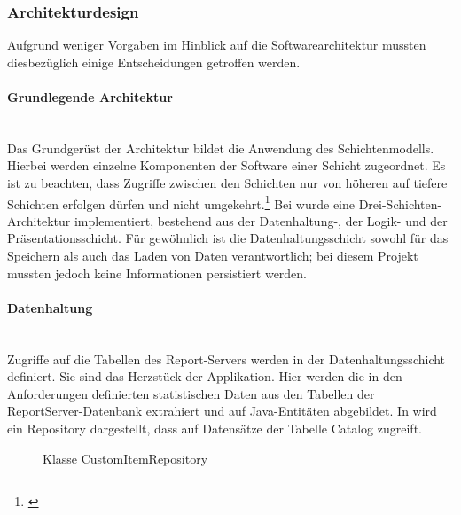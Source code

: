 \subsubsection{Architekturdesign}
\label{sec:Architekturdesign}
Aufgrund weniger Vorgaben im Hinblick auf die Softwarearchitektur mussten diesbezüglich einige Entscheidungen getroffen werden.

\paragraph{Grundlegende Architektur} ~\\
\label{p:Architektur}
Das Grundgerüst der Architektur bildet die Anwendung des Schichtenmodells. Hierbei werden einzelne Komponenten der Software einer Schicht zugeordnet. Es ist zu beachten, dass Zugriffe zwischen den Schichten nur von höheren auf tiefere Schichten erfolgen dürfen und nicht umgekehrt.\footnote{\Vgl \cite{wiki:arch}}
Bei \projektName wurde eine Drei-Schichten-Architektur implementiert, bestehend aus der Datenhaltung-, der Logik- und der Präsentationsschicht. Für gewöhnlich ist die Datenhaltungsschicht sowohl für das Speichern als auch das Laden von Daten verantwortlich; bei diesem Projekt mussten jedoch keine Informationen persistiert werden.

\paragraph{Datenhaltung} ~\\
\label{p:Datenhaltung}
Zugriffe auf die Tabellen des Report-Servers werden in der Datenhaltungsschicht definiert. Sie sind das Herzstück der Applikation. Hier werden die in den Anforderungen definierten statistischen Daten aus den Tabellen der ReportServer-Datenbank extrahiert und auf Java-Entitäten abgebildet. In  wird ein Repository dargestellt, dass auf Datensätze der Tabelle Catalog zugreift.
\begin{figure}[htb]
	\centering
	\caption{Klasse CustomItemRepository}
	\label{fig:CustomItemRepository}
\end{figure}

